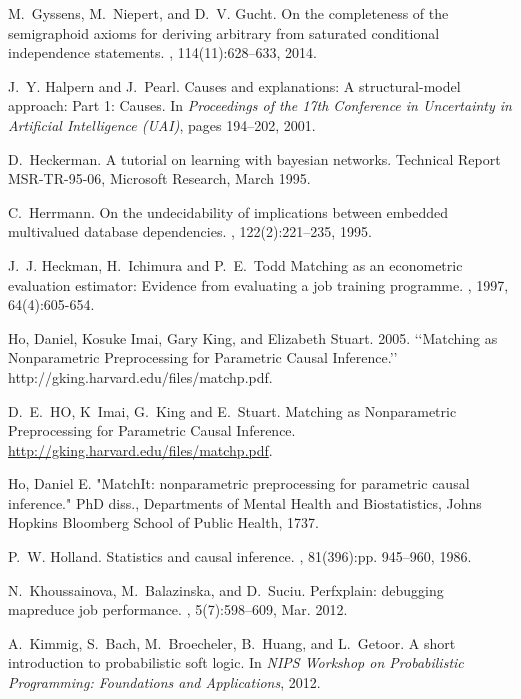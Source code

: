 \begin{thebibliography}{10}
M.~Gyssens, M.~Niepert, and D.~V. Gucht.
\newblock On the completeness of the semigraphoid axioms for deriving arbitrary
  from saturated conditional independence statements.
, 114(11):628--633, 2014.

J.~Y. Halpern and J.~Pearl.
\newblock Causes and explanations: {A} structural-model approach: Part 1:
  Causes.
\newblock In {\em Proceedings of the 17th Conference in Uncertainty in
  Artificial Intelligence ({UAI})}, pages 194--202, 2001.

D.~Heckerman.
\newblock A tutorial on learning with bayesian networks.
\newblock Technical Report MSR-TR-95-06, Microsoft Research, March 1995.

C.~Herrmann.
\newblock On the undecidability of implications between embedded multivalued
  database dependencies.
, 122(2):221--235, 1995.

J.~J. Heckman,  H.~Ichimura and P.~E.~Todd
\newblock Matching as an econometric evaluation estimator: Evidence from evaluating a job training programme.
, 1997, 64(4):605-654.

Ho, Daniel, Kosuke Imai, Gary King, and Elizabeth Stuart. 2005. ‘‘Matching as Nonparametric Preprocessing
for Parametric Causal Inference.’’ http://gking.harvard.edu/files/matchp.pdf.


D.~E.~HO, K~Imai, G.~King and E.~Stuart.
\newblock Matching as Nonparametric Preprocessing
for Parametric Causal Inference.
\newblock \url{http://gking.harvard.edu/files/matchp.pdf}.


Ho, Daniel E. "MatchIt: nonparametric preprocessing for parametric causal inference." PhD diss., Departments of Mental Health and Biostatistics, Johns Hopkins Bloomberg School of Public Health, 1737.

P.~W. Holland.
\newblock Statistics and causal inference.
, 81(396):pp.
  945--960, 1986.

N.~Khoussainova, M.~Balazinska, and D.~Suciu.
\newblock Perfxplain: debugging mapreduce job performance.
, 5(7):598--609, Mar. 2012.

A.~Kimmig, S.~Bach, M.~Broecheler, B.~Huang, and L.~Getoor.
\newblock A short introduction to probabilistic soft logic.
\newblock In {\em NIPS Workshop on Probabilistic Programming: Foundations and
  Applications}, 2012.


\end{thebibliography}
